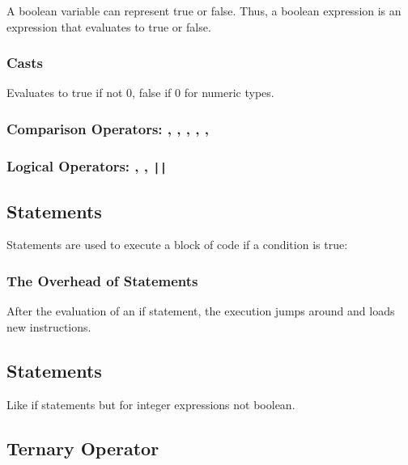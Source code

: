 \documentclass{article}
\begin{document}
\noindent
A boolean variable can represent true or false. Thus, a boolean expression is an expression that evaluates to true or false.

\subsubsection{ Casts}

\noindent
Evaluates to true if not 0, false if 0 for numeric types.

\subsubsection{Comparison Operators: \inlinecpp{==}, \inlinecpp{!=}, \inlinecpp{<}, \inlinecpp{<=}, \inlinecpp{>}, \inlinecpp{>=}}

\centercpp{==, !=, <, <=, >, >=}

\subsubsection{Logical Operators: \inlinecpp{!}, \inlinecpp{&&}, \texttt{||}}

\centercpp{!, &&, \|\|}

\subsection{ Statements}

\noindent
{} Statements are used to execute a block of code if a condition is true:

\subsubsection{The Overhead of  Statements}

After the evaluation of an if statement, the execution jumps around and loads new instructions.

\subsection{ Statements}

Like if statements but for integer expressions not boolean.

\subsection{Ternary Operator }
\end{document}
